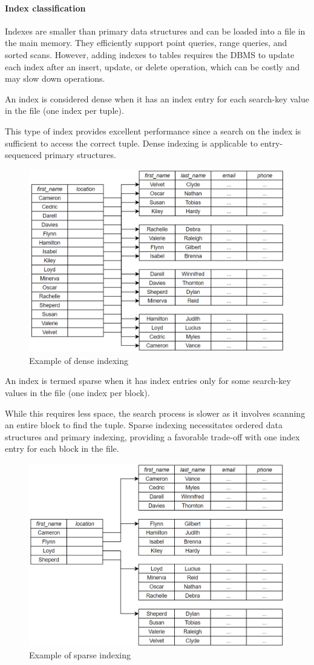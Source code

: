 \paragraph*{Index classification}
Indexes are smaller than primary data structures and can be loaded into a file in the main memory.
They efficiently support point queries, range queries, and sorted scans. 
However, adding indexes to tables requires the DBMS to update each index after an insert, update, or delete operation, which can be costly and may slow down operations.

\begin{definition}
    An index is considered dense when it has an index entry for each search-key value in the file (one index per tuple). 
\end{definition}
This type of index provides excellent performance since a search on the index is sufficient to access the correct tuple. 
Dense indexing is applicable to entry-sequenced primary structures.
\begin{figure}[H]
    \centering
    \includegraphics[width=0.5\linewidth]{images/dense.png}
    \caption{Example of dense indexing}
\end{figure} 
\begin{definition}
    An index is termed sparse when it has index entries only for some search-key values in the file (one index per block). 
\end{definition}
While this requires less space, the search process is slower as it involves scanning an entire block to find the tuple. 
Sparse indexing necessitates ordered data structures and primary indexing, providing a favorable trade-off with one index entry for each block in the file.
\begin{figure}[H]
    \centering
    \includegraphics[width=0.5\linewidth]{images/sparse.png}
    \caption{Example of sparse indexing}
\end{figure} 

